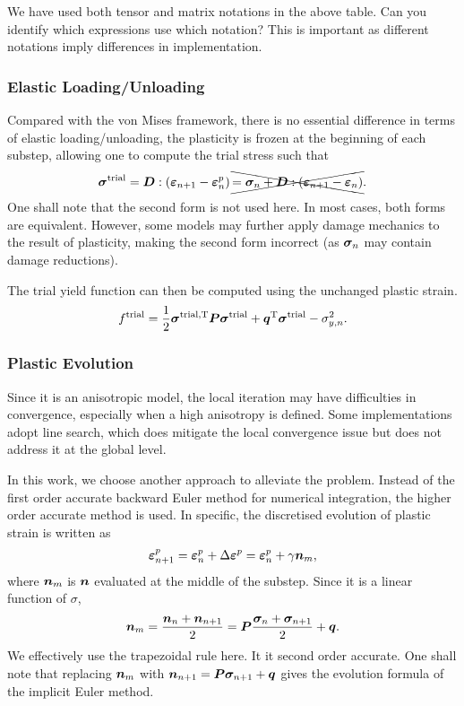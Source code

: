 We have used both tensor and matrix notations in the above table.
Can you identify which expressions use which notation?
This is important as different notations imply differences in implementation.
\subsubsection{Elastic Loading/Unloading}
Compared with the von Mises framework, there is no essential difference in terms of elastic loading/unloading, the plasticity is frozen at the beginning of each substep, allowing one to compute the trial stress such that
\begin{gather}
\bm{\sigma}^\text{trial}=\bm{D}:\left(\bm{\varepsilon}_{n+1}-\bm{\varepsilon}^p_n\right)\xcancel{=\bm{\sigma}_n+\bm{D}:\left(\bm{\varepsilon}_{n+1}-\bm{\varepsilon}_n\right)}.
\end{gather}
One shall note that the second form is not used here. In most cases, both forms are equivalent. However, some models may further apply damage mechanics to the result of plasticity, making the second form incorrect (as $\bm{\sigma}_n$ may contain damage reductions).

The trial yield function can then be computed using the unchanged plastic strain.
\begin{gather}
f^\text{trial}=\dfrac{1}{2}\bm{\sigma}^\text{trial,T}\bm{P}\bm{\sigma}^\text{trial}+\bm{q}^{\mathrm{T}}\bm{\sigma}^\text{trial}-\sigma_{y,n}^2.
\end{gather}
\subsubsection{Plastic Evolution}
Since it is an anisotropic model, the local iteration may have difficulties in convergence, especially when a high anisotropy is defined. Some implementations \cite{Krasnovskiy2004,SouzaNeto2008} adopt line search, which does mitigate the local convergence issue but does not address it at the global level.

In this work, we choose another approach to alleviate the problem. Instead of the first order accurate backward Euler method for numerical integration, the higher order accurate method is used. In specific, the discretised evolution of plastic strain is written as
\begin{gather}
\bm{\varepsilon}^p_{n+1}=\bm{\varepsilon}^p_{n}+\Delta\bm{\varepsilon}^p=\bm{\varepsilon}^p_{n}+\gamma\bm{n}_{m},
\end{gather}
where $\bm{n}_{m}$ is $\bm{n}$ evaluated at the middle of the substep. Since it is a linear function of $\sigma$,
\begin{gather}
\bm{n}_m=\dfrac{\bm{n}_n+\bm{n}_{n+1}}{2}=\bm{P}\dfrac{\bm{\sigma}_n+\bm{\sigma}_{n+1}}{2}+\bm{q}.
\end{gather}
We effectively use the trapezoidal rule here.
It it second order accurate.
One shall note that replacing $\bm{n}_m$ with $\bm{n}_{n+1}=\bm{P}\bm{\sigma}_{n+1}+\bm{q}$ gives the evolution formula of the implicit Euler method.

